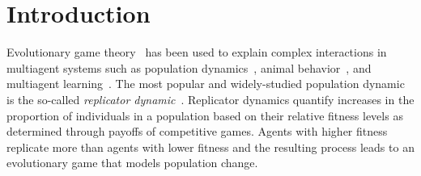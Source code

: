 \documentclass{aamas2014}
\begin{document}




\section{Introduction}


Evolutionary game theory~\cite{MaynardSmith82,Gintis09} has been used to explain complex interactions in multiagent 
systems such as population dynamics~\cite{HS98}, animal behavior~\cite{MSP73}, and 
multiagent learning~\cite{Tuyls07What}. The most popular and widely-studied population dynamic is the
so-called {\it replicator dynamic}~\cite{TJ78}. Replicator dynamics quantify 
increases in the proportion of individuals in a population based on their relative fitness levels as determined through 
payoffs of competitive games. Agents with higher fitness replicate more than agents with lower fitness and the resulting 
process leads to an evolutionary game that models population change. 
\end{document}

